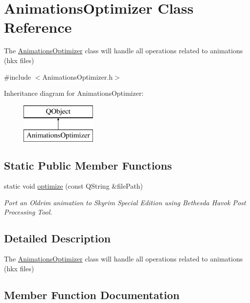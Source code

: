 \hypertarget{class_animations_optimizer}{}\section{Animations\+Optimizer Class Reference}
\label{class_animations_optimizer}


The \mbox{\hyperlink{class_animations_optimizer}{Animations\+Optimizer}} class will handle all operations related to animations (hkx files)  




{\ttfamily \#include $<$Animations\+Optimizer.\+h$>$}

Inheritance diagram for Animations\+Optimizer\+:\begin{figure}[H]
\begin{center}
\leavevmode
\includegraphics[height=2.000000cm]{class_animations_optimizer}
\end{center}
\end{figure}
\subsection*{Static Public Member Functions}
\begin{DoxyCompactItemize}
\item 
static void \mbox{\hyperlink{class_animations_optimizer_a9a67ec157cdea3565ada6b92bcdb50ac}{optimize}} (const Q\+String \&file\+Path)
\begin{DoxyCompactList}\small\item\em Port an Oldrim animation to Skyrim Special Edition using Bethesda Havok Post Processing Tool. \end{DoxyCompactList}\end{DoxyCompactItemize}


\subsection{Detailed Description}
The \mbox{\hyperlink{class_animations_optimizer}{Animations\+Optimizer}} class will handle all operations related to animations (hkx files) 

\subsection{Member Function Documentation}
\mbox{\label{class_animations_optimizer_a9a67ec157cdea3565ada6b92bcdb50ac}} 
